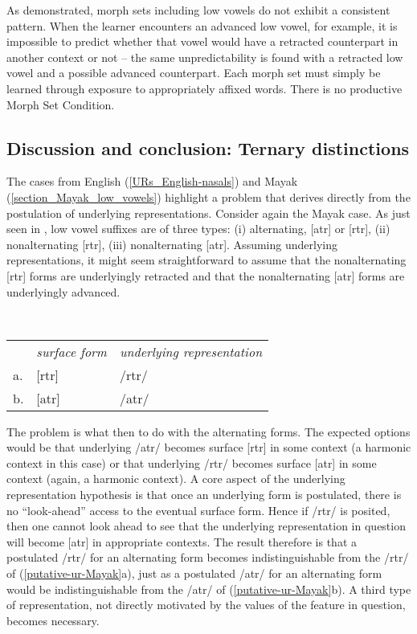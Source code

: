As demonstrated, morph sets including low vowels do not exhibit a consistent pattern. When the learner encounters an advanced low vowel, for example, it is impossible to predict whether that vowel would have a retracted counterpart in another context or not -- the same unpredictability is found with a retracted low vowel and a possible advanced counterpart. Each morph set must simply be learned through exposure to appropriately affixed words. There is no productive Morph Set Condition.


\subsection{Discussion and conclusion: Ternary distinctions}\label{section_three-way_distinctions}

The cases from English (\textsection\ref{URs_English-nasals}) and Mayak (\textsection\ref{section_Mayak_low_vowels}) highlight a problem that derives directly from the postulation of underlying representations. Consider again the Mayak case. As just seen in , low vowel suffixes are of three types: (i) alternating, [atr] or [rtr], (ii) nonalternating [rtr], (iii) nonalternating [atr]. Assuming underlying representations, it might seem straightforward to assume that the nonalternating [rtr] forms are underlyingly retracted and that the nonalternating [atr] forms are underlyingly advanced.


\begin{example} \label{putative-ur-Mayak}\smallskip\\
\begin{tabular}{@{}lll@{}}
   &{\it surface form} &{\it underlying representation} \\
a. &{[}rtr] &/rtr/ \\
b. &{[}atr] &/atr/
\end{tabular}
\end{example}

The problem is what then to do with the alternating forms. The expected options would be that underlying /atr/ becomes surface [rtr] in some context (a harmonic context in this case) or that underlying /rtr/ becomes surface [atr] in some context (again, a harmonic context). A core aspect of the underlying representation hypothesis is that once an underlying form is postulated, there is no ``look-ahead'' access to the eventual surface form. Hence if /rtr/ is posited, then one cannot look ahead to see that the underlying representation in question will become [atr] in appropriate contexts. The result therefore is that a postulated /rtr/ for an alternating form becomes indistinguishable from the /rtr/ of (\ref{putative-ur-Mayak}a), just as a postulated /atr/ for an alternating form would be indistinguishable from the /atr/ of (\ref{putative-ur-Mayak}b). A third type of representation, not directly motivated by the values of the feature in question, becomes necessary.




